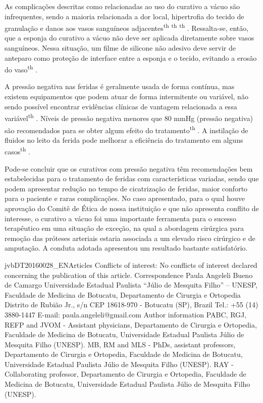 \documentclass[numberinsection,times,10pt,spreadimages]{memoir}
\begin{document}
As complicações descritas como relacionadas ao uso do curativo a vácuo são
infrequentes, sendo a maioria relacionada a dor local, hipertrofia do tecido de
granulação e danos aos vasos sanguíneos adjacentes\textsuperscript{th}
\textsuperscript{th}
\textsuperscript{th}
. Ressalta-se, então, que a esponja do curativo a vácuo
não deve ser aplicada diretamente sobre vasos sanguíneos. Nessa situação, um
filme
de silicone não adesivo deve servir de anteparo como proteção de interface entre
a
esponja e o tecido, evitando a erosão do vaso\textsuperscript{th}
.

A pressão negativa nas feridas é geralmente usada de forma contínua, mas existem
equipamentos que podem atuar de forma intermitente ou variável, não sendo
possível
encontrar evidências clínicas de vantagem relacionada a essa
variável\textsuperscript{th}
. Níveis de pressão negativa
menores que 80 mmHg (pressão negativa) são recomendados para se obter algum
efeito
do tratamento\textsuperscript{th}
. A instilação de
fluidos no leito da ferida pode melhorar a eficiência do tratamento em alguns
casos\textsuperscript{th}
.

Pode-se concluir que os curativos com pressão negativa têm recomendações bem
estabelecidas para o tratamento de feridas com características variadas, sendo
que
podem apresentar redução no tempo de cicatrização de feridas, maior conforto
para o
paciente e raras complicações. No caso apresentado, para o qual houve aprovação
do
Comitê de Ética de nossa instituição e que não apresenta conflito de interesse,
o
curativo a vácuo foi uma importante ferramenta para o sucesso terapêutico em uma
situação de exceção, na qual a abordagem cirúrgica para remoção das próteses
arteriais estaria associada a um elevado risco cirúrgico e de amputação. A
conduta
adotada apresentou um resultado bastante satisfatório.

jvbDT20160028\_{}ENArticles
Conflicts of interest: No conflicts of interest declared concerning the
publication of this article.
\label{*}
Correspondence Paula Angeleli Bueno de Camargo Universidade
Estadual Paulista “Júlio de Mesquita Filho” – UNESP, Faculdade de Medicina de
Botucatu, Departamento de Cirurgia e Ortopedia Distrito de Rubião Jr., s/n CEP
18618-970 - Botucatu (SP), Brazil Tel.: +55 (14) 3880-1447 E-mail:
paula.angeleli@gmail.com
Author information PABC, RGJ, REFP and JVOM - Assistant physicians,
Departamento de Cirurgia e Ortopedia, Faculdade de Medicina de Botucatu,
Universidade Estadual Paulista Júlio de Mesquita Filho (UNESP). MB, RM and
MLS - PhDs, assistant professors, Departamento de Cirurgia e Ortopedia,
Faculdade de Medicina de Botucatu, Universidade Estadual Paulista Júlio de
Mesquita Filho (UNESP). RAY - Collaborating professor, Departamento de
Cirurgia e Ortopedia, Faculdade de Medicina de Botucatu, Universidade
Estadual Paulista Júlio de Mesquita Filho (UNESP).
\end{document}
